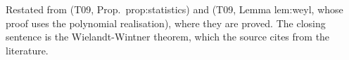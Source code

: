 Restated from  (T09, Prop.~prop:statistics) and  (T09, Lemma lem:weyl, whose proof uses the polynomial realisation), where they are proved. The closing sentence is the Wielandt-Wintner theorem, which the source cites from the literature.
